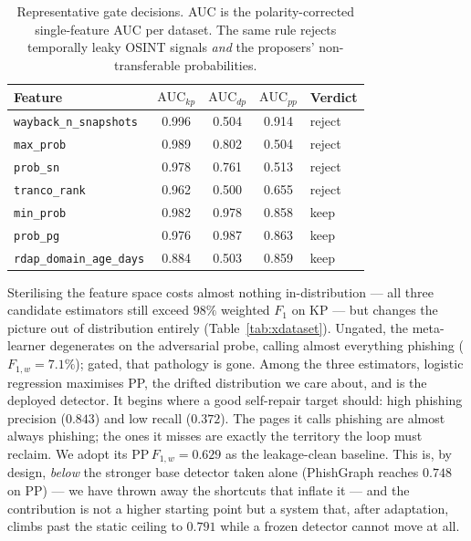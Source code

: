 \begin{table}[H]
\centering
\caption{Representative gate decisions. AUC is the polarity-corrected
single-feature AUC per dataset. The same rule rejects temporally leaky OSINT
signals \emph{and} the proposers' non-transferable probabilities.}
\label{tab:leakage}
\small
\begin{tabular}{@{}lcccl@{}}
\toprule
Feature & $\mathrm{AUC}_{kp}$ & $\mathrm{AUC}_{dp}$ & $\mathrm{AUC}_{pp}$ & Verdict \\
\midrule
\texttt{wayback\_n\_snapshots}   & 0.996 & 0.504 & 0.914 & reject \\
\texttt{max\_prob}               & 0.989 & 0.802 & 0.504 & reject \\
\texttt{prob\_sn}                & 0.978 & 0.761 & 0.513 & reject \\
\texttt{tranco\_rank}            & 0.962 & 0.500 & 0.655 & reject \\
\midrule
\texttt{min\_prob}               & 0.982 & 0.978 & 0.858 & keep \\
\texttt{prob\_pg}                & 0.976 & 0.987 & 0.863 & keep \\
\texttt{rdap\_domain\_age\_days} & 0.884 & 0.503 & 0.859 & keep \\
\bottomrule
\end{tabular}
\end{table}

Sterilising the feature space costs almost nothing in-distribution --- all three
candidate estimators still exceed $98\%$ weighted $F_1$ on KP --- but changes the
picture out of distribution entirely (Table~\ref{tab:xdataset}). Ungated, the
meta-learner degenerates on the adversarial probe, calling almost everything
phishing ($F_{1,w}=7.1\%$); gated, that pathology is gone. Among the three
estimators, logistic regression maximises PP, the drifted distribution we care
about, and is the deployed detector. It begins where a good self-repair target
should: high phishing precision ($0.843$) and low recall ($0.372$). The pages it
calls phishing are almost always phishing; the ones it misses are exactly the
territory the loop must reclaim. We adopt its $\mathrm{PP}\,F_{1,w}=0.629$ as the
leakage-clean baseline. This is, by design, \emph{below} the stronger base
detector taken alone (PhishGraph reaches $0.748$ on PP) --- we have thrown away
the shortcuts that inflate it --- and the contribution is not a higher starting
point but a system that, after adaptation, climbs past the static ceiling to
$0.791$ while a frozen detector cannot move at all.

